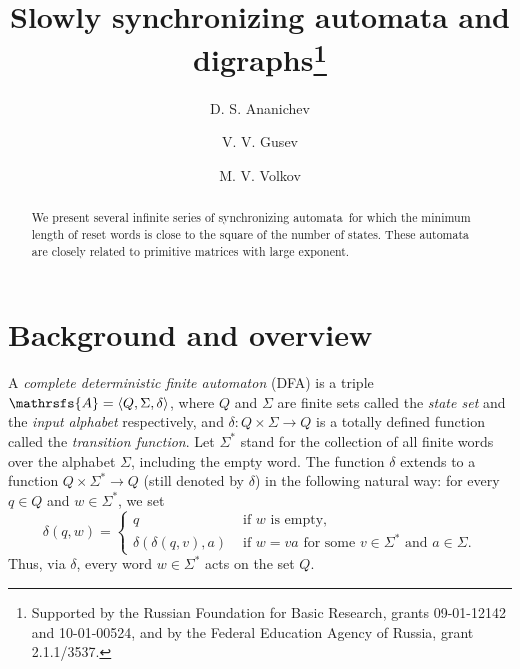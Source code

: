 \documentclass[11pt]{llncs}
\newcommand{\sa}{synchronizing automata}
\begin{document}
\title{Slowly synchronizing automata and digraphs\thanks{Supported
by the Russian Foundation for Basic Research, grants 09-01-12142
and 10-01-00524, and by the Federal Education Agency of Russia,
grant 2.1.1/3537.}}


\author{D. S. Ananichev \and V. V. Gusev \and M. V. Volkov}




\maketitle

\begin{abstract}
We present several infinite series of \sa\ for which
the minimum length of reset words is close to the
square of the number of states. These automata are
closely related to primitive  matrices with large exponent.
\end{abstract}


\section{Background and overview}
\label{intro}

A \emph{complete deterministic finite automaton} (DFA) is a triple
$\mathrsfs{A}=\langle Q,\Sigma,\delta\rangle$, where $Q$ and
$\Sigma$ are finite sets called the \emph{state set} and the
\emph{input alphabet} respectively, and $\delta:Q\times\Sigma\to
Q$ is a totally defined function called the \emph{transition
function}. Let $\Sigma^*$ stand for the collection of all finite
words over the alphabet $\Sigma$, including the empty word.
The function $\delta$ extends to a function $Q\times\Sigma^*\to Q$
(still denoted by $\delta$) in the following natural way: for every
$q\in Q$ and $w\in\Sigma^*$, we set
$$\delta(q,w)=\begin{cases}
q &\text{ if $w$ is empty},\\
\delta(\delta(q,v),a) &\text{ if $w=va$ for some $v\in\Sigma^*$ and $a\in\Sigma$}.
\end{cases}$$
Thus, via $\delta$, every word $w\in\Sigma^*$ acts on the set $Q$.
\end{document}
